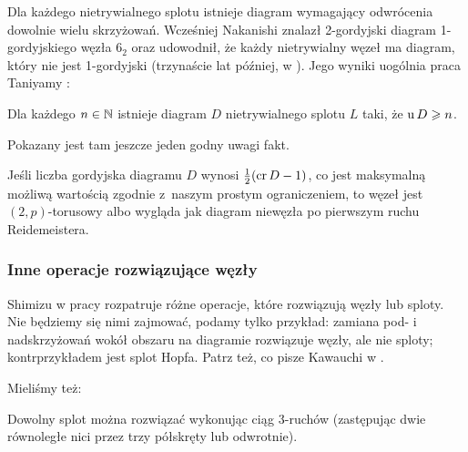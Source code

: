 Dla każdego nietrywialnego splotu istnieje diagram wymagający odwrócenia dowolnie wielu skrzyżowań.
Wcześniej Nakanishi \cite{nakanishi1983} znalazł 2-gordyjski diagram 1-gordyjskiego węzła $6_2$ oraz udowodnił, że każdy nietrywialny węzeł ma diagram, który nie jest 1-gordyjski (trzynaście lat później, w \cite{nakanishi1996}).
%
Jego wyniki uogólnia praca Taniyamy \cite{taniyama2009}:
%

\begin{proposition}
    Dla każdego $n \in \mathbb N$ istnieje diagram $D$ nietrywialnego splotu $L$ taki, że $\operatorname{u} D \geqslant n$.
\end{proposition}

Pokazany jest tam jeszcze jeden godny uwagi fakt.

\begin{proposition}
    Jeśli liczba gordyjska diagramu $D$ wynosi $\frac 12 (\operatorname{cr} D - 1)$, co jest maksymalną możliwą wartością zgodnie z~naszym prostym ograniczeniem, to węzeł jest $(2,p)$-torusowy albo wygląda jak diagram niewęzła po pierwszym ruchu Reidemeistera.
\end{proposition}











\subsubsection{Inne operacje rozwiązujące węzły}

Shimizu w pracy \cite{shimizu2014} rozpatruje różne operacje, które rozwiązują węzły lub sploty.
%
Nie będziemy się nimi zajmować, podamy tylko przykład: zamiana pod- i nadskrzyżowań wokół obszaru na diagramie rozwiązuje węzły, ale nie sploty; kontrprzykładem jest splot Hopfa.
%
Patrz też, co pisze Kawauchi w \cite[s. 141-154]{kawauchi1996}.

Mieliśmy też:

\begin{conjecture}
    Dowolny splot można rozwiązać wykonując ciąg 3-ruchów (zastępując dwie równoległe nici przez trzy półskręty lub odwrotnie).
\end{conjecture}

